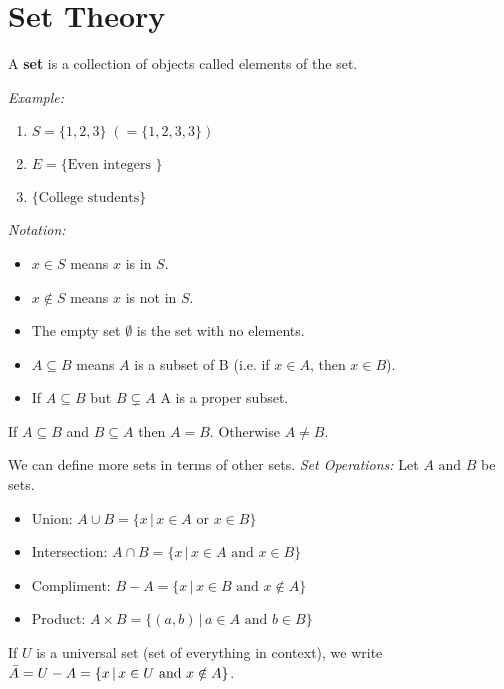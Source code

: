 \documentclass[../main.tex]{subfiles}
\begin{document}
\section{Set Theory}

\begin{definition}[]
    A \textbf{set} is a collection of objects called elements of the set.
\end{definition}

\textit{Example:}
\begin{enumerate}
    \item \( S = \{ 1, 2, 3 \} \; (= \{ 1,2,3,3 \}) \)
    \item \( E = \{ \text{Even integers } \} \)
    \item \( \{ \text{College students} \} \)
\end{enumerate}

\textit{Notation:}
\begin{itemize}
    \item \( x \in S \) means \( x \) is in \( S \).
    \item \( x \notin S \) means \( x \) is not in \( S \).
    \item The empty set \( \emptyset \) is the set with no elements.
    \item \( A \subseteq B \) means \( A \) is a subset of B (i.e. if \( x \in A \), then \( x \in B \)).
    \item If \( A \subseteq B \) but \( B \subsetneq A \) A is a proper subset.
\end{itemize}

If \( A \subseteq B \) and \( B \subseteq A \) then \( A = B \). Otherwise \( A \neq B \).

We can define more sets in terms of other sets.
\textit{Set Operations:}
Let \( A \text{ and } B \) be sets.
\begin{itemize}
    \item Union: \( A \cup B  = \{ x \, | \, x \in A \text{ or } x \in B \}\)
    \item Intersection: \( A \cap B  = \{ x \, | \, x \in A \text{ and } x \in B \}\)
    \item Compliment: \( B - A = \{ x \, | \, x \in B \text{ and } x \notin A \} \)
    \item Product: \( A \times B = \{ (a, b) \, | \, a \in A \text{ and } b \in B \} \)
\end{itemize}

If \( U \) is a universal set (set of everything in context), we write
\( \bar{A} = U - A \\ = \{ x \, | \, x \in U \text{ and } x \notin A \} \).
\end{document}
